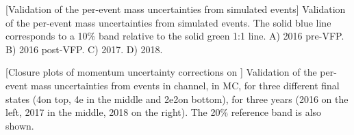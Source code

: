 \begin{multiFigure}
    \centering
        [Validation of the per-event mass uncertainties from simulated \ztoee events]
        {Validation of the per-event mass uncertainties from simulated \ztoee events.
        The solid blue line corresponds to a 10\% band relative to the solid green 1:1 line.
        \;A) 2016 pre-VFP.
        \;B) 2016 post-VFP.
        \;C) 2017.
        \;D) 2018.
        }
    \label{fig:ZClosure_test_ELE}
\end{multiFigure}
\begin{multiFigure}
    \centering


        [Closure plots of momentum uncertainty corrections on \gghtofourl]
        {Validation of the per-event mass uncertainties from events in \gghtofourl channel, in MC, 
		for three different final states (4\Pmu on top, 4e in the middle and 2e2\Pmu on bottom), 
		for three years (2016 on the left, 2017 in the middle, 2018 on the right).
		The 20\% reference band is also shown.}
    \label{fig:HClosure_test}
\end{multiFigure}
